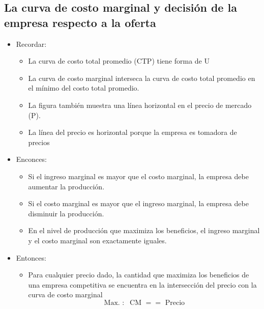 \documentclass{article}
\begin{document}
\subsection{La curva de costo marginal y decisión de la empresa respecto a la oferta}
\begin{itemize}
    \item Recordar:
        \begin{itemize}
            \item  La curva de costo total promedio (CTP) tiene forma de U
            \item La curva de costo marginal interseca la curva de costo total promedio en el mínimo del costo total promedio.
            \item La figura también muestra una línea horizontal en el precio de mercado (P). 
            \item  La línea del precio es horizontal porque la empresa es tomadora de precios
        \end{itemize}
    
    \item Enconces:
        \begin{itemize}
            \item Si el ingreso marginal es mayor que el costo marginal, la empresa debe aumentar la producción. 
            \item Si el costo marginal es mayor que el ingreso marginal, la empresa debe disminuir la producción. 
            \item En el nivel de producción que maximiza los beneficios, el ingreso marginal y el costo marginal son exactamente iguales.
        \end{itemize}
    
    \item Entonces:
        \begin{itemize}
            \item  Para cualquier precio dado, la cantidad que maximiza los beneficios de una empresa competitiva se encuentra en la intersección del precio con la curva de costo marginal
                \[
                  \text{ Max. }: \; \text{ CM } == \text{ Precio }
                \]
        \end{itemize}
\end{itemize}
\end{document}
